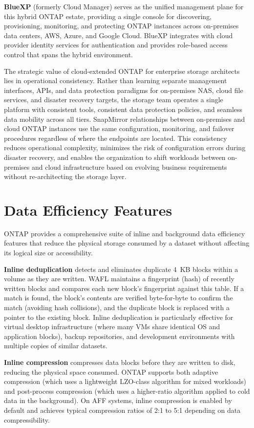 \textbf{BlueXP} (formerly Cloud Manager) serves as the unified management plane for this hybrid ONTAP estate, providing a single console for discovering, provisioning, monitoring, and protecting ONTAP instances across on-premises data centers, AWS, Azure, and Google Cloud. BlueXP integrates with cloud provider identity services for authentication and provides role-based access control that spans the hybrid environment.

The strategic value of cloud-extended ONTAP for enterprise storage architects lies in operational consistency. Rather than learning separate management interfaces, APIs, and data protection paradigms for on-premises NAS, cloud file services, and disaster recovery targets, the storage team operates a single platform with consistent tools, consistent data protection policies, and seamless data mobility across all tiers. SnapMirror relationships between on-premises and cloud ONTAP instances use the same configuration, monitoring, and failover procedures regardless of where the endpoints are located. This consistency reduces operational complexity, minimizes the risk of configuration errors during disaster recovery, and enables the organization to shift workloads between on-premises and cloud infrastructure based on evolving business requirements without re-architecting the storage layer.

\section{Data Efficiency Features}

ONTAP provides a comprehensive suite of inline and background data efficiency features that reduce the physical storage consumed by a dataset without affecting its logical size or accessibility.

\textbf{Inline deduplication} detects and eliminates duplicate 4~KB blocks within a volume as they are written. WAFL maintains a fingerprint (hash) of recently written blocks and compares each new block's fingerprint against this table. If a match is found, the block's contents are verified byte-for-byte to confirm the match (avoiding hash collisions), and the duplicate block is replaced with a pointer to the existing block. Inline deduplication is particularly effective for virtual desktop infrastructure (where many VMs share identical OS and application blocks), backup repositories, and development environments with multiple copies of similar datasets.

\textbf{Inline compression} compresses data blocks before they are written to disk, reducing the physical space consumed. ONTAP supports both adaptive compression (which uses a lightweight LZO-class algorithm for mixed workloads) and post-process compression (which uses a higher-ratio algorithm applied to cold data in the background). On AFF systems, inline compression is enabled by default and achieves typical compression ratios of 2:1 to 5:1 depending on data compressibility.

